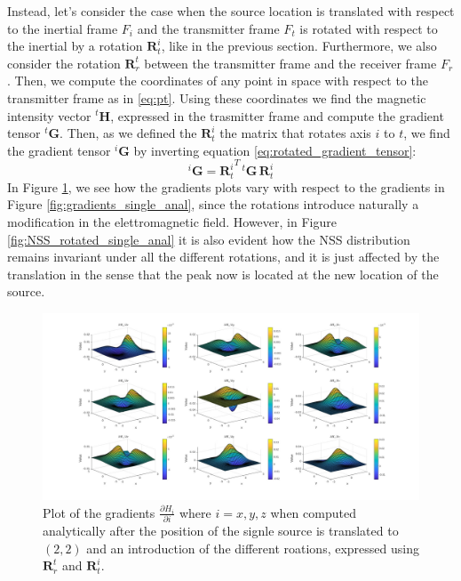Instead, let's consider the case when the source location is translated
with respect to the inertial frame $F_i$ and the transmitter frame $F_t$ is rotated
with respect to the inertial by a rotation $\mathbf{R}_t^i$, like in the previous 
section.
Furthermore, we also consider the rotation $\mathbf{R}^t_r$ between the transmitter frame and the receiver
frame $F_r$.
Then, we compute the coordinates of any point in space with respect to the
transmitter frame as in \ref{eq:pt}.
Using these coordinates we find the magnetic intensity vector ${}^t\mathbf{H}$,
expressed in the trasmitter frame and compute the gradient tensor ${}^t \mathbf{G}$.
Then, as we defined the $\mathbf{R}^i_t$ the matrix that rotates axis $i$ to $t$,
we find the gradient tensor ${}^i \mathbf{G}$ by inverting equation \ref{eq:rotated_gradient_tensor}:
\begin{equation}
    {}^i \mathbf{G} = {\mathbf{R}_t^i}^T \, {}^t\mathbf{G} \, \mathbf{R}_t^i
\end{equation}
In Figure \ref{fig:gradients_rotated_single_anal}, we see how the gradients plots
vary with respect to the gradients in Figure \ref{fig:gradients_single_anal},
since the rotations introduce naturally a modification in the elettromagnetic field.
However, in Figure \ref{fig:NSS_rotated_single_anal} it is also evident how the
NSS distribution remains invariant under all the different rotations, and it is 
just affected by the translation in the sense that the peak now is located
at the new location of the source. 
\begin{figure}
\centering
\includegraphics[width=\textwidth]{images/gradients_rotated_single_anal.jpg}
\caption{Plot of the gradients $\frac{\partial H_i}{\partial i}$ where $i = x, y, z$
when computed analytically after the position of the signle source is translated to $(2,2)$ and an 
introduction of the different roations, expressed using $\mathbf{R}^t_r$ and $\mathbf{R}_t^i$.}
\label{fig:gradients_rotated_single_anal}
\end{figure}
